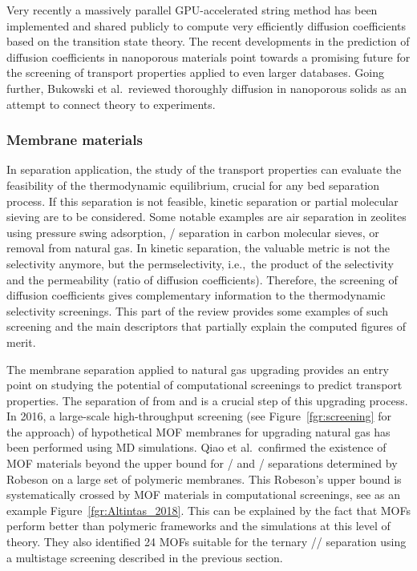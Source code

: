 \documentclass[main.tex]{subfiles}
\begin{document}
Very recently a massively parallel GPU-accelerated string method has been implemented and shared publicly to compute very efficiently diffusion coefficients {based on the transition state theory}.\autocite{Zhou_2021} The recent developments in the prediction of diffusion coefficients in nanoporous materials point towards a promising future for the screening of transport properties applied to even larger databases. Going further, Bukowski et al.\ reviewed thoroughly diffusion in nanoporous solids as an attempt to connect theory to experiments.\autocite{Bukowski_2021}

\subsubsection{Membrane materials}

In separation application, the study of the transport properties can evaluate the feasibility of the thermodynamic equilibrium, crucial for any bed separation process. If this separation is not feasible, kinetic separation or partial molecular sieving are to be considered. Some notable examples are air separation in zeolites using pressure swing adsorption,\autocite{ruthven1990air} / separation in carbon molecular sieves,\autocite{Reid_1999} or  removal from natural gas.\autocite{Wang_2019} In kinetic separation, the valuable metric is not the selectivity anymore, but the permselectivity, i.e.,\ the product of the selectivity and the permeability (ratio of diffusion coefficients). Therefore, the screening of diffusion coefficients gives complementary information to the thermodynamic selectivity screenings. This part of the review provides some examples of such screening and the main descriptors that partially explain the computed figures of merit.

The membrane separation applied to natural gas upgrading provides an entry point on studying the potential of computational screenings to predict transport properties. The separation of  from  and  is a crucial step of this upgrading process.
In 2016, a large-scale high-throughput screening (see Figure~\ref{fgr:screening} for the approach) of hypothetical MOF membranes for upgrading natural gas has been performed using MD simulations.\autocite{Qiao_2016} Qiao et al.\ confirmed the existence of MOF materials beyond the upper bound for / and / separations determined by Robeson on a large set of polymeric membranes.\autocite{robeson1991correlation} This Robeson's upper bound is systematically crossed by MOF materials in computational screenings, see as an example Figure~\ref{fgr:Altintas_2018}. This can be explained by the fact that MOFs perform better than polymeric frameworks and the simulations at this level of theory. They also identified 24 MOFs suitable for the ternary // separation using a multistage screening described in the previous section.
\end{document}
